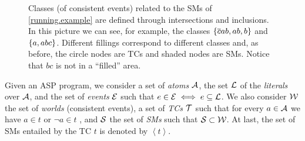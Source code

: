 \documentclass{llncs}
\newcommand{\co}[1]{\ensuremath{\overline{#1}}}
\newcommand{\fml}[1]{\ensuremath{{\cal #1}}}
\newcommand{\tcgen}[1]{\ensuremath{\left<#1\right>}}
\renewcommand{\note}[1]{
    \stepcounter{remark}%
    {\!\!\color{red}/}\footnotemark[\arabic{remark}]\!\!%
    \footnotetext[\arabic{remark}]{{\color{red}/}#1}
}
\begin{document}
\begin{figure}[t]
\begin{center}
    \end{center}

    \caption{Classes (of consistent events) related to the \aclp{SM} of \cref{running.example} are defined through intersections and inclusions. In this picture we can see, for example, the classes $\set{\co{c}ab, ab, b}$ and $\set{a, abc}$. Different fillings correspond to different classes and, as before, the circle nodes are \aclp{TC} and shaded nodes are \aclp{SM}. Notice that $bc$ is not in a ``filled'' area.}
    \label{fig:running.example.classes}
\end{figure}

Given an ASP program, we consider a set of \emph{atoms} $ \fml{A}$, the set $\fml{L}$ of the \emph{literals} over \fml{A}, and the set of \emph{events} $\fml{E}$ such that $e \in \fml{E} \iff e \subseteq \fml{L}$. We also consider $\fml{W}$ the set of \emph{worlds} (consistent events), 
a set of \emph{\aclp{TC}} $\fml{T}$ such that for every $a \in \fml{A}$ we have $a \in t$ or $\neg a \in t$
, and $\fml{S}$ the set of \emph{\aclp{SM}} such that $ \fml{S}\subset\fml{W}$. At last, the set of \aclp{SM} entailed by the \acl{TC} $t$ is denoted by $\tcgen{t}$.
\end{document}
